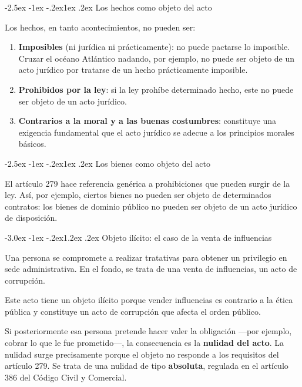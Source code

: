 \documentclass[12pt,oneside]{book}
\makeatletter
\renewcommand\section{\@startsection{section}{1}{\z@}%
  {-3.0ex \@plus -1ex \@minus -.2ex}{1.2ex \@plus .2ex}%
  {\normalfont\large\bfseries\color{acento}}}
\renewcommand\subsection{\@startsection{subsection}{2}{\z@}%
  {-2.5ex \@plus -1ex \@minus -.2ex}{1ex \@plus .2ex}%
  {\normalfont\normalsize\bfseries}}
\makeatother
\begin{document}
\subsection{Los hechos como objeto del acto}

Los hechos, en tanto acontecimientos, no pueden ser:

\begin{enumerate}
    \item \textbf{Imposibles} (ni jurídica ni prácticamente): no puede pactarse lo imposible. Cruzar el océano Atlántico nadando, por ejemplo, no puede ser objeto de un acto jurídico por tratarse de un hecho prácticamente imposible.
    \item \textbf{Prohibidos por la ley}: si la ley prohíbe determinado hecho, este no puede ser objeto de un acto jurídico.
    \item \textbf{Contrarios a la moral y a las buenas costumbres}: constituye una exigencia fundamental que el acto jurídico se adecue a los principios morales básicos.
\end{enumerate}

\subsection{Los bienes como objeto del acto}

El artículo 279 hace referencia genérica a prohibiciones que pueden surgir de la ley. Así, por ejemplo, ciertos bienes no pueden ser objeto de determinados contratos: los bienes de dominio público no pueden ser objeto de un acto jurídico de disposición.

\section{Objeto ilícito: el caso de la venta de influencias}

\begin{ejemplo}
Una persona se compromete a realizar tratativas para obtener un privilegio en sede administrativa. En el fondo, se trata de una venta de influencias, un acto de corrupción.

Este acto tiene un objeto ilícito porque vender influencias es contrario a la ética pública y constituye un acto de corrupción que afecta el orden público.

Si posteriormente esa persona pretende hacer valer la obligación ---por ejemplo, cobrar lo que le fue prometido---, la consecuencia es la \textbf{nulidad del acto}. La nulidad surge precisamente porque el objeto no responde a los requisitos del artículo 279. Se trata de una nulidad de tipo \textbf{absoluta}, regulada en el artículo 386 del Código Civil y Comercial.
\end{ejemplo}
\end{document}
